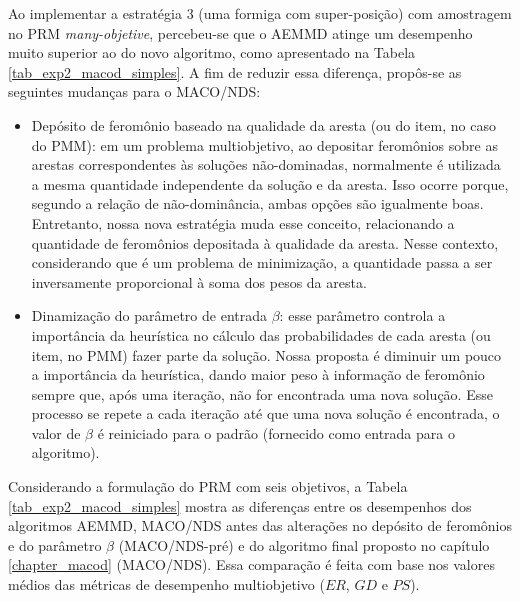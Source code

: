 Ao implementar a estratégia 3 (uma formiga com super-posição) com amostragem no PRM \textit{many-objetive}, percebeu-se que o AEMMD atinge um desempenho muito superior ao do novo algoritmo, como apresentado na Tabela \ref{tab_exp2_macod_simples}. A fim de reduzir essa diferença, propôs-se as seguintes mudanças para o MACO/NDS:

\begin{itemize}
	\item Depósito de feromônio baseado na qualidade da aresta (ou do item, no caso do PMM): em um problema multiobjetivo, ao depositar feromônios sobre as arestas correspondentes às soluções não-dominadas, normalmente é utilizada a mesma quantidade independente da solução e da aresta. Isso ocorre porque, segundo a relação de não-dominância, ambas opções são igualmente boas. Entretanto, nossa nova estratégia muda esse conceito, relacionando a quantidade de feromônios depositada à qualidade da aresta. Nesse contexto, considerando que é um problema de minimização, a quantidade passa a ser inversamente proporcional à soma dos pesos da aresta.
	\item Dinamização do parâmetro de entrada $\beta$: esse parâmetro controla a importância da heurística no cálculo das probabilidades de cada aresta (ou item, no PMM) fazer parte da solução. Nossa proposta é diminuir um pouco a importância da heurística, dando maior peso à informação de feromônio sempre que, após uma iteração, não for encontrada uma nova solução. Esse processo se repete a cada iteração até que uma nova solução é encontrada, o valor de $\beta$ é reiniciado para o padrão (fornecido como entrada para o algoritmo).
\end{itemize}

Considerando a formulação do PRM com seis objetivos, a Tabela \ref{tab_exp2_macod_simples} mostra as diferenças entre os desempenhos dos algoritmos AEMMD, MACO/NDS antes das alterações no depósito de feromônios e do parâmetro $\beta$ (MACO/NDS-pré) e do algoritmo final proposto no capítulo \ref{chapter_macod} (MACO/NDS). Essa comparação é feita com base nos valores médios das métricas de desempenho multiobjetivo ($ER$, $GD$ e $PS$).

